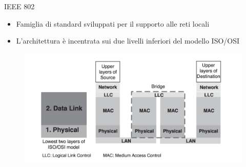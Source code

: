 \begin{frame}{IEEE 802}
	\begin{itemize}
		\item Famiglia di standard sviluppati per il supporto alle reti locali
		\item L'architettura è incentrata sui due livelli inferiori del modello ISO/OSI
	\end{itemize}
	\begin{figure}[h] 
		\includegraphics[scale=0.3,cfbox=blue_slides 1pt 0pt]{imgs/arch_ieee802.png}
	\end{figure}
\end{frame}


